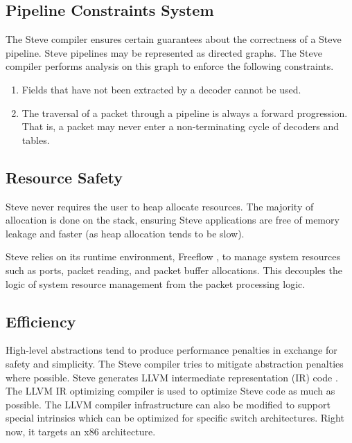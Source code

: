 \subsection{Pipeline Constraints System}

The Steve compiler ensures certain guarantees about the correctness of a Steve
pipeline. Steve pipelines may be represented as directed graphs. The
Steve compiler performs analysis on this graph to enforce the following
constraints.

\begin{enumerate}
\item Fields that have not been extracted by a decoder cannot be used.

\item The traversal of a packet through a pipeline is always a forward
progression. That is, a packet may never enter a non-terminating cycle
of decoders and tables.
\end{enumerate}

\subsection{Resource Safety}

Steve never requires the user to heap allocate resources. The majority of
allocation is done on the stack, ensuring Steve applications are free of
memory leakage and faster (as heap allocation tends to be slow).

Steve relies on its runtime environment, Freeflow \cite{freeflow_software},
to manage system resources such as
ports, packet reading, and packet buffer allocations.
This decouples the logic of system resource management from the packet
processing logic.

\subsection{Efficiency}


High-level abstractions tend to produce performance penalties in exchange for safety and simplicity.
The Steve compiler tries to mitigate abstraction penalties where possible.
Steve generates LLVM intermediate representation (IR) code
\cite{llvm_webpage}.
The LLVM IR optimizing compiler is used to optimize Steve code as much as possible.
The LLVM compiler infrastructure can also be modified to support special intrinsics which can be optimized for specific switch architectures.
Right now, it targets an x86 architecture.

